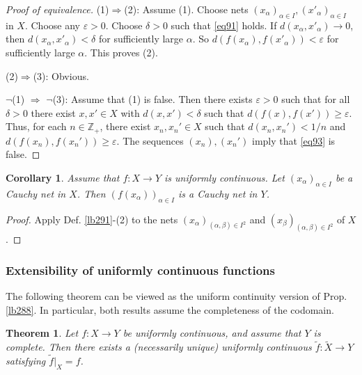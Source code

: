 \documentclass[12pt,b5paper,notitlepage]{article}
\theoremstyle{definition}
\theoremstyle{plain}
\newtheorem{thm}[df]{Theorem}
\newtheorem{co}[df]{Corollary}
\newcommand{\wtd}{\widetilde}
\newcommand{\Zbb}{\mathbb Z}
\newcommand{\eps}{\varepsilon}
\numberwithin{equation}{section}
\begin{document}
\begin{proof}[Proof of equivalence]
(1)$\Rightarrow$(2): Assume (1). Choose nets $(x_\alpha)_{\alpha\in I},(x'_\alpha)_{\alpha\in I}$ in $X$. Choose any $\eps>0$. Choose $\delta>0$ such that \eqref{eq91} holds. If $d(x_\alpha,x'_\alpha)\rightarrow0$, then $d(x_\alpha,x'_\alpha)<\delta$ for sufficiently large $\alpha$. So $d(f(x_\alpha),f(x'_\alpha))<\eps$ for sufficiently large $\alpha$. This proves (2).

(2)$\Rightarrow$(3): Obvious.

$\neg$(1) $\Rightarrow$ $\neg$(3): Assume that (1) is false. Then there exists $\eps>0$ such that for all $\delta>0$  there exist $x,x'\in X$ with $d(x,x')<\delta$ such that $d(f(x),f(x'))\geq\eps$. Thus, for each $n\in\Zbb_+$, there exist $x_n,x_n'\in X$ such that $d(x_n,x_n')<1/n$ and $d(f(x_n),f(x_n'))\geq\eps$. The sequences $(x_n),(x_n')$ imply that \eqref{eq93} is false.
\end{proof}




\begin{co}\label{lb292}
Assume that $f:X\rightarrow Y$ is uniformly continuous. Let $(x_\alpha)_{\alpha\in I}$ be a Cauchy net in $X$. Then $(f(x_\alpha))_{\alpha\in I}$ is a Cauchy net in $Y$.
\end{co}

\begin{proof}
Apply Def. \ref{lb291}-(2) to the nets $(x_\alpha)_{(\alpha,\beta)\in I^2}$ and $(x_\beta)_{(\alpha,\beta)\in I^2}$ of $X$.
\end{proof}








\subsubsection{Extensibility of uniformly continuous functions}



The following theorem can be viewed as the uniform continuity version of Prop. \ref{lb288}. In particular, both results assume the completeness of the codomain.

\begin{thm}\label{lb297}
Let $f:X\rightarrow Y$ be uniformly continuous, and assume that $Y$ is complete. Then there exists a (necessarily unique) uniformly continuous $\wtd f:\wtd X\rightarrow Y$ satisfying $\wtd f|_X=f$.
\end{thm}
\end{document}
